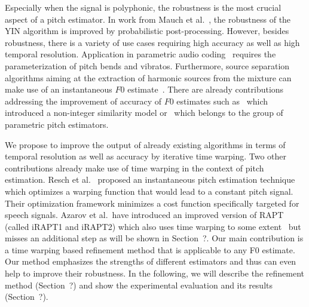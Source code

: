 Especially when the signal is polyphonic, the robustness is the most crucial aspect of a pitch estimator. In work from Mauch et al.~\cite{mauch2014pyin}, the robustness of the \textsc{YIN} algorithm is improved by probabilistic post-processing. However, besides robustness, there is a variety of use cases requiring high accuracy as well as high temporal resolution. Application in parametric audio coding~\cite{purnhagen2000hiln} requires the parameterization of pitch bends and vibratos. Furthermore, source separation algorithms aiming at the extraction of harmonic sources from the mixture can make use of an instantaneous $F0$ estimate~\cite{virtanen2008combining, stoterunison}. There are already contributions addressing the improvement of accuracy of $F0$ estimates such as~\cite{medan1991super} which introduced a non-integer similarity model or~\cite{christensen2007joint} which belongs to the group of parametric pitch estimators.

We propose to improve the output of already existing algorithms in terms of temporal resolution as well as accuracy by iterative time warping. Two other contributions already make use of time warping in the context of pitch estimation. Resch et al.~\cite{resch} proposed an instantaneous pitch estimation technique which optimizes a warping function that would lead to a constant pitch signal. Their optimization framework minimizes a cost function specifically targeted for speech signals. Azarov et al.\ have introduced an improved version of RAPT (called iRAPT1 and iRAPT2) which also uses time warping to some extent~\cite{azarov2012instantaneous} but misses an additional step as will be shown in Section~?.
Our main contribution is a time warping based refinement method that is applicable to any F0 estimate. Our method emphasizes the strengths of different estimators and thus can even help to improve their robustness. In the following, we will describe the refinement method (Section~?) and show the experimental evaluation and its results (Section~?).

